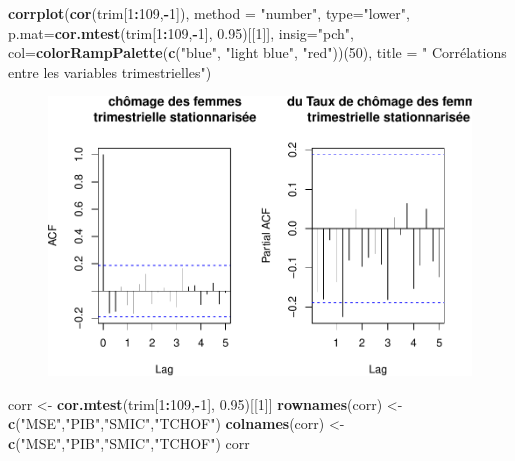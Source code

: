\documentclass[11pt,]{article}
\newenvironment{Shaded}{\begin{snugshade}}{\end{snugshade}}
\newcommand{\KeywordTok}[1]{\textcolor[rgb]{0.13,0.29,0.53}{\textbf{#1}}}
\newcommand{\DataTypeTok}[1]{\textcolor[rgb]{0.13,0.29,0.53}{#1}}
\newcommand{\DecValTok}[1]{\textcolor[rgb]{0.00,0.00,0.81}{#1}}
\newcommand{\FloatTok}[1]{\textcolor[rgb]{0.00,0.00,0.81}{#1}}
\newcommand{\StringTok}[1]{\textcolor[rgb]{0.31,0.60,0.02}{#1}}
\newcommand{\OperatorTok}[1]{\textcolor[rgb]{0.81,0.36,0.00}{\textbf{#1}}}
\newcommand{\NormalTok}[1]{#1}
\begin{document}
\begin{Shaded}
\begin{Highlighting}[]
\KeywordTok{corrplot}\NormalTok{(}\KeywordTok{cor}\NormalTok{(trim[}\DecValTok{1}\OperatorTok{:}\DecValTok{109}\NormalTok{,}\OperatorTok{-}\DecValTok{1}\NormalTok{]), }\DataTypeTok{method =} \StringTok{"number"}\NormalTok{, }\DataTypeTok{type=}\StringTok{"lower"}\NormalTok{,}
         \DataTypeTok{p.mat=}\KeywordTok{cor.mtest}\NormalTok{(trim[}\DecValTok{1}\OperatorTok{:}\DecValTok{109}\NormalTok{,}\OperatorTok{-}\DecValTok{1}\NormalTok{], }\FloatTok{0.95}\NormalTok{)[[}\DecValTok{1}\NormalTok{]], }\DataTypeTok{insig=}\StringTok{"pch"}\NormalTok{,}
         \DataTypeTok{col=}\KeywordTok{colorRampPalette}\NormalTok{(}\KeywordTok{c}\NormalTok{(}\StringTok{"blue"}\NormalTok{, }\StringTok{"light blue"}\NormalTok{, }\StringTok{"red"}\NormalTok{))(}\DecValTok{50}\NormalTok{), }\DataTypeTok{title =} \StringTok{"}
\StringTok{         Corrélations entre les variables trimestrielles"}\NormalTok{)}
\end{Highlighting}
\end{Shaded}

\begin{figure}
\centering
\includegraphics{doc_files/figure-latex/unnamed-chunk-9-1.pdf}
\caption{\label{fig9}}
\end{figure}

\begin{Shaded}
\begin{Highlighting}[]
\NormalTok{corr <-}\StringTok{ }\KeywordTok{cor.mtest}\NormalTok{(trim[}\DecValTok{1}\OperatorTok{:}\DecValTok{109}\NormalTok{,}\OperatorTok{-}\DecValTok{1}\NormalTok{], }\FloatTok{0.95}\NormalTok{)[[}\DecValTok{1}\NormalTok{]]}
\KeywordTok{rownames}\NormalTok{(corr) <-}\StringTok{ }\KeywordTok{c}\NormalTok{(}\StringTok{"MSE"}\NormalTok{,}\StringTok{"PIB"}\NormalTok{,}\StringTok{"SMIC"}\NormalTok{,}\StringTok{"TCHOF"}\NormalTok{)}
\KeywordTok{colnames}\NormalTok{(corr) <-}\StringTok{ }\KeywordTok{c}\NormalTok{(}\StringTok{"MSE"}\NormalTok{,}\StringTok{"PIB"}\NormalTok{,}\StringTok{"SMIC"}\NormalTok{,}\StringTok{"TCHOF"}\NormalTok{)}
\NormalTok{corr}
\end{Highlighting}
\end{Shaded}
\end{document}
